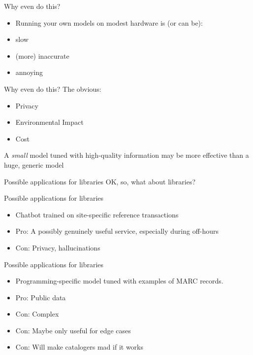 \documentclass[handout]{beamer} %
\begin{document}
\begin{frame}{Why even do this?}
\begin{itemize}
	\item Running your own models on modest hardware is (or can be):
	\pause
	\item slow
	\pause
	\item (more) inaccurate
	\pause
	\item annoying
\end{itemize}  
\end{frame}

\begin{frame}{Why even do this?}
	The obvious:
	\begin{itemize}
		\item Privacy
		\pause
		\item Environmental Impact
		\pause 
		\item Cost
		
	\end{itemize}
\end{frame}


\begin{frame}
	A \textit{small} model tuned with high-quality information may be more effective than a huge, generic model
\end{frame}


\begin{frame}{Possible applications for libraries}
	OK, so, what about libraries?
\end{frame}

\begin{frame}{Possible applications for libraries}
	\begin{itemize}
		\item Chatbot trained on site-specific reference transactions
		\pause
		\item Pro: A possibly genuinely useful service, especially during off-hours
		\pause
		\item Con: Privacy, hallucinations
	\end{itemize}
\end{frame}

\begin{frame}{Possible applications for libraries}
	\begin{itemize}
		\item Programming-specific model tuned with examples of MARC records.
		\pause
		\item Pro: Public data
		\pause
		\item Con: Complex
		\pause
		\item Con: Maybe only useful for edge cases
		\pause
		\item Con: Will make catalogers mad if it works
	\end{itemize}
\end{frame}
\end{document}
